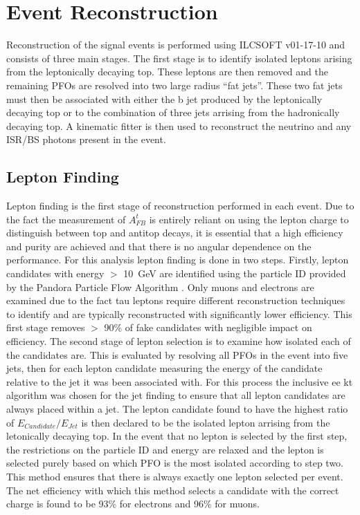 \section{Event Reconstruction}
Reconstruction of the signal events is performed using ILCSOFT v01-17-10 and consists of three main stages. The first stage is to identify isolated leptons arising from the leptonically decaying top. These leptons are then removed and the remaining PFOs are resolved into two large radius ``fat jets''. These two fat jets must then be associated with either the b jet produced by the leptonically decaying top or to the combination of three jets arrising from the hadronically decaying top. A kinematic fitter is then used to reconstruct the neutrino and any \ac{ISR}/\ac{BS} photons present in the event.

\subsection{Lepton Finding}

Lepton finding is the first stage of reconstruction performed in each event. Due to the fact the measurement of $A_{FB}^{t}$ is entirely reliant on using the lepton charge to distinguish between top and antitop decays, it is essential that a high efficiency and purity are achieved and that there is no angular dependence on the performance. For this analysis lepton finding is done in two steps. Firstly, lepton candidates with energy $>$ 10~GeV are identified using the particle ID provided by the Pandora Particle Flow Algorithm \cite{Thomson200925}. Only muons and electrons are examined due to the fact tau leptons require different reconstruction techniques to identify and are typically reconstructed with significantly lower efficiency. This first stage removes $>$ 90\% of fake candidates with negligible impact on efficiency. The second stage of lepton selection is to examine how isolated each of the candidates are. This is evaluated by resolving all PFOs in the event into five jets, then for each lepton candidate measuring the energy of the candidate relative to the jet it was been associated with. For this process the inclusive ee kt algorithm was chosen for the jet finding to ensure that all lepton candidates are always placed within a jet. The lepton candidate found to have the highest ratio of $E_{Candidate}/E_{Jet}$ is then declared to be the isolated lepton arrising from the letonically decaying top. In the event that no lepton is selected by the first step, the restrictions on the particle ID and energy are relaxed and the lepton is selected purely based on which PFO is the most isolated according to step two. This method ensures that there is always exactly one lepton selected per event. The net efficiency with which this method selects a candidate with the correct charge is found to be 93\% for electrons and 96\% for muons.

